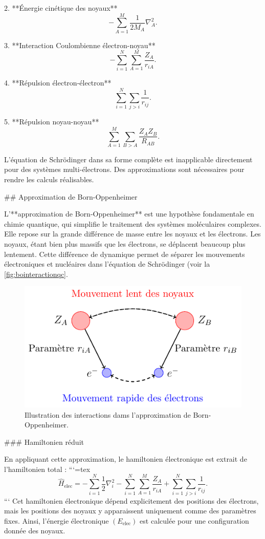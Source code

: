 \documentclass[12pt,a4paper]{report}
\begin{document}
\begin{markdown}
2. **Énergie cinétique des noyaux**
   \[
   -\sum_{A=1}^M \frac{1}{2M_A} \nabla_A^2 .
   \]

3. **Interaction Coulombienne électron-noyau**
   \[
   -\sum_{i=1}^N \sum_{A=1}^M \frac{Z_A}{r_{iA}} .
   \]

4. **Répulsion électron-électron**
   \[
   \sum_{i=1}^N \sum_{j>i} \frac{1}{r_{ij}} .
   \]

5. **Répulsion noyau-noyau**
   \[
   \sum_{A=1}^M \sum_{B>A} \frac{Z_A Z_B}{R_{AB}} .
   \]

L'équation de Schrödinger dans sa forme complète est inapplicable directement pour des systèmes multi-électrons. Des approximations sont nécessaires pour rendre les calculs réalisables.


## Approximation de Born-Oppenheimer

L'**approximation de Born-Oppenheimer** est une hypothèse fondamentale en chimie quantique, qui simplifie le traitement des systèmes moléculaires complexes. Elle repose sur la grande différence de masse entre les noyaux et les électrons. Les noyaux, étant bien plus massifs que les électrons, se déplacent beaucoup plus lentement. Cette différence de dynamique permet de séparer les mouvements électroniques et nucléaires dans l’équation de Schrödinger (voir la \autoref{fig:bointeractionqc}.

\begin{figure}[tbph]
\centering
\includegraphics[width=0.7\linewidth]{Graphics/BO_Interaction_QC}
\caption{Illustration des interactions dams l'approximation de Born-Oppenheimer.}
\label{fig:bointeractionqc}
\end{figure}

### Hamiltonien réduit

En appliquant cette approximation, le hamiltonien électronique est extrait de l'hamiltonien total :
```{=tex}
\[
\hat{H}_{\text{elec}} = -\sum_{i=1}^N \frac{1}{2} \nabla_i^2 - \sum_{i=1}^N \sum_{A=1}^M \frac{Z_A}{r_{iA}} + \sum_{i=1}^N \sum_{j>i} \frac{1}{r_{ij}} .
\]
```
Cet hamiltonien électronique dépend explicitement des positions des électrons, mais les positions des noyaux y apparaissent uniquement comme des paramètres fixes. Ainsi, l'énergie électronique \((E_{\text{elec}})\) est calculée pour une configuration donnée des noyaux.


\end{markdown}
\end{document}
